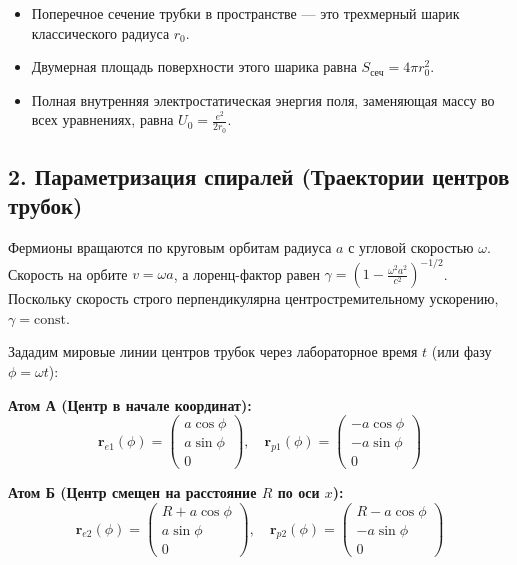 \documentclass[12pt,a4paper]{article}
\begin{document}
\begin{itemize}
    \item Поперечное сечение трубки в пространстве — это трехмерный шарик классического радиуса $r_0$.
    \item Двумерная площадь поверхности этого шарика равна $S_{сеч} = 4\pi r_0^2$.
    \item Полная внутренняя электростатическая энергия поля, заменяющая массу во всех уравнениях, равна $U_0 = \frac{e^2}{2r_0}$.
\end{itemize}

\subsection*{2. Параметризация спиралей (Траектории центров трубок)}

Фермионы вращаются по круговым орбитам радиуса $a$ с угловой скоростью $\omega$. Скорость на орбите $v = \omega a$, а лоренц-фактор равен $\gamma = (1 - \frac{\omega^2 a^2}{c^2})^{-1/2}$. Поскольку скорость строго перпендикулярна центростремительному ускорению, $\gamma = \text{const}$.

Зададим мировые линии центров трубок через лабораторное время $t$ (или фазу $\phi = \omega t$):

\textbf{Атом А (Центр в начале координат):}
\begin{equation}
\mathbf{r}_{e1}(\phi) = \begin{pmatrix} a \cos\phi \\ a \sin\phi \\ 0 \end{pmatrix}, \quad 
\mathbf{r}_{p1}(\phi) = \begin{pmatrix} -a \cos\phi \\ -a \sin\phi \\ 0 \end{pmatrix}
\end{equation}

\textbf{Атом Б (Центр смещен на расстояние $R$ по оси $x$):}
\begin{equation}
\mathbf{r}_{e2}(\phi) = \begin{pmatrix} R + a \cos\phi \\ a \sin\phi \\ 0 \end{pmatrix}, \quad 
\mathbf{r}_{p2}(\phi) = \begin{pmatrix} R - a \cos\phi \\ -a \sin\phi \\ 0 \end{pmatrix}
\end{equation}
\end{document}
